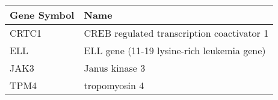 \begin{tabular}{ll}
\toprule
Gene Symbol &                                       Name \\
\midrule
      CRTC1 & CREB regulated transcription coactivator 1 \\
        ELL & ELL gene (11-19 lysine-rich leukemia gene) \\
       JAK3 &                             Janus kinase 3 \\
       TPM4 &                              tropomyosin 4 \\
\bottomrule
\end{tabular}
